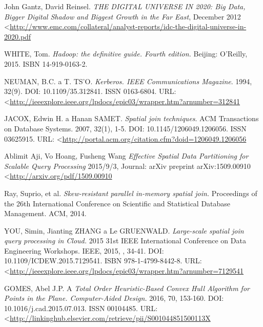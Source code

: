 \documentclass[a4paper,12pt,oneside]{report}
\renewcommand\baselinestretch{1.3}
\begin{document}
	
	\newpage
	\renewcommand\baselinestretch{1.2}
	\selectfont
	\renewcommand{\refname}{References}
	\addcontentsline{toc}{section}{ \refname}
	
	\begin{thebibliography}{99}
		\label{References}
		
		John Gantz, David Reinsel. \textit{THE DIGITAL UNIVERSE IN 2020: Big Data,
		Bigger Digital Shadow and Biggest Growth in
		the Far East}, December 2012
\textless\url{http://www.emc.com/collateral/analyst-reports/idc-the-digital-universe-in-2020.pdf}
		
		WHITE, Tom. \textit{Hadoop: the definitive guide. Fourth edition.} Beijing:
		O'Reilly, 2015. ISBN 14-919-0163-2.
		
		NEUMAN, B.C. a T. TS'O. \textit{Kerberos. IEEE Communications Magazine}. 1994,
		32(9). DOI: 10.1109/35.312841. ISSN 0163-6804.  URL:
\textless\url{http://ieeexplore.ieee.org/lpdocs/epic03/wrapper.htm?arnumber=312841}

		JACOX, Edwin H. a Hanan SAMET. \textit{Spatial join techniques}. ACM
		Transactions on Database Systems. 2007, 32(1), 1-5. DOI:
		10.1145/1206049.1206056. ISSN 03625915. URL:
		\textless\url{http://portal.acm.org/citation.cfm?doid=1206049.1206056}
		
		Ablimit Aji, Vo Hoang, Fusheng Wang \textit{Effective Spatial Data
		Partitioning
			for Scalable Query Processing} 2015/9/3,
		Journal: arXiv preprint arXiv:1509.00910
		\textless\url{http://arxiv.org/pdf/1509.00910}
		
		Ray, Suprio, et al. \textit{Skew-resistant parallel in-memory spatial join.}
		Proceedings of the 26th International Conference on Scientific and Statistical
		Database Management. ACM, 2014.
		
		YOU, Simin, Jianting ZHANG a Le GRUENWALD. \textit{Large-scale spatial join
			query processing in Cloud.} 2015 31st IEEE International Conference on Data
		Engineering Workshops. IEEE, 2015, , 34-41. DOI: 10.1109/ICDEW.2015.7129541.
		ISBN 978-1-4799-8442-8. URL:
\textless\url{http://ieeexplore.ieee.org/lpdocs/epic03/wrapper.htm?arnumber=7129541}
		
		GOMES, Abel J.P. A \textit{Total Order Heuristic-Based Convex Hull Algorithm
for
			Points in the Plane. Computer-Aided Design.} 2016, 70, 153-160. DOI:
		10.1016/j.cad.2015.07.013. ISSN 00104485.  URL:
		\textless\url{http://linkinghub.elsevier.com/retrieve/pii/S001044851500113X}
		

\end{thebibliography}
\end{document}
